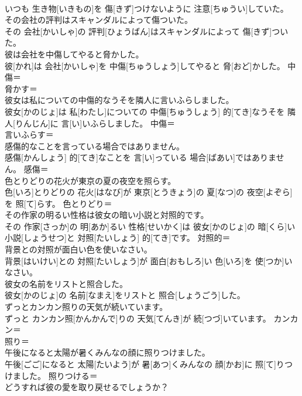 \documentclass[8pt]{extreport}
\begin{document}
\begin{CJK}{UTF8}{min}
\\	いつも 生き物[いきもの]を 傷[きず]つけないように 注意[ちゅうい]していた。	
\\	その会社の評判はスキャンダルによって傷ついた。	
\\	その 会社[かいしゃ]の 評判[ひょうばん]はスキャンダルによって 傷[きず]ついた。	
\\	彼は会社を中傷してやると脅かした。	
\\	彼[かれ]は 会社[かいしゃ]を 中傷[ちゅうしょう]してやると 脅[おど]かした。	中傷＝ 
\\	脅かす＝ 
\\	彼女は私についての中傷的なうそを隣人に言いふらしました。	
\\	彼女[かのじょ]は 私[わたし]についての 中傷[ちゅうしょう] 的[てき]なうそを 隣人[りんじん]に 言[い]いふらしました。	中傷＝ 
\\	言いふらす＝ 
\\	感傷的なことを言っている場合ではありません。	
\\	感傷[かんしょう] 的[てき]なことを 言[い]っている 場合[ばあい]ではありません。	感傷＝ 
\\	色とりどりの花火が東京の夏の夜空を照らす。	
\\	色[いろ]とりどりの 花火[はなび]が 東京[とうきょう]の 夏[なつ]の 夜空[よぞら]を 照[て]らす。	色とりどり＝ 
\\	その作家の明るい性格は彼女の暗い小説と対照的です。	
\\	その 作家[さっか]の 明[あか]るい 性格[せいかく]は 彼女[かのじょ]の 暗[くら]い 小説[しょうせつ]と 対照[たいしょう] 的[てき]です。	対照的＝ 
\\	背景との対照が面白い色を使いなさい。	
\\	背景[はいけい]との 対照[たいしょう]が 面白[おもしろ]い 色[いろ]を 使[つか]いなさい。	
\\	彼女の名前をリストと照合した。	
\\	彼女[かのじょ]の 名前[なまえ]をリストと 照合[しょうごう]した。	
\\	ずっとカンカン照りの天気が続いています。	
\\	ずっと カンカン照[かんかんで]りの 天気[てんき]が 続[つづ]いています。	カンカン＝ 
\\	照り＝ 
\\	午後になると太陽が暑くみんなの顔に照りつけました。	
\\	午後[ごご]になると 太陽[たいよう]が 暑[あつ]くみんなの 顔[かお]に 照[て]りつけました。	照りつける＝ 
\\	どうすれば彼の愛を取り戻せるでしょうか？	

\end{CJK}
\end{document}
